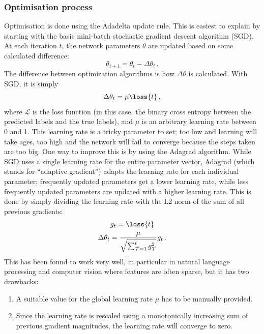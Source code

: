 \subsubsection{Optimisation process}\label{sec:optim}
Optimisation is done using the Adadelta update rule\citep{adadelta}. This is
easiest to explain by starting with the basic mini-batch stochastic gradient
descent algorithm (SGD). At each iteration $t$, the network parameters $\theta$
are updated based on some calculated difference:
\begin{equation}
  \theta_{t+1} = \theta_{t} - \Delta\theta_t\,.
\end{equation}
The difference between optimization algorithms is how $\Delta\theta$ is
calculated. With SGD, it is simply
\begin{equation}
  \Delta\theta_t = \mu \loss{t}\,,
\end{equation}
where $\mathcal{L}$ is the loss function (in this case, the binary cross entropy
between the predicted labels and the true labels), and $\mu$ is an arbitrary
learning rate between 0 and 1. This learning rate is a tricky parameter to set;
too low and learning will take ages, too high and the network will fail to
converge because the steps taken are too big. One way to improve this is by
using the Adagrad\citep{adagrad} algorithm. While SGD uses a single learning
rate for the entire parameter vector, Adagrad (which stands for ``adaptive
gradient'') adapts the learning rate for each individual parameter; frequently
updated parameters get a lower learning rate, while less frequently updated
parameters are updated with a higher learning rate. This is done by simply
dividing the learning rate with the L2 norm of the sum of all previous gradients:
\begin{gather}
  g_{t} = \loss{t} \\
  \Delta\theta_t = \frac{\mu}{\sqrt{\sum^{t}_{\mathcal{T}=1}g_{\mathcal{T}}^2}} g_{t}\,.
\end{gather}
This has been found to work very well, in particular in natural language
processing and computer vision where features are often sparse, but it has two
drawbacks:
\begin{enumerate}
  \item A suitable value for the global learning rate $\mu$ has to be
    manually provided.
  \item Since the learning rate is rescaled using a monotonically increasing sum of
    previous gradient magnitudes, the learning rate will converge to zero.
\end{enumerate}
